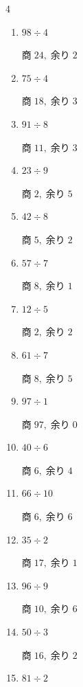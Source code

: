 \begin{multicols}{4}
\begin{enumerate}
        $商\; 8,\; 余り\; 3$

  \item $98 \div 4$

        $商\; 24,\; 余り\; 2$

  \item $75 \div 4$

        $商\; 18,\; 余り\; 3$

  \item $91 \div 8$

        $商\; 11,\; 余り\; 3$

  \item $23 \div 9$

        $商\; 2,\; 余り\; 5$

  \item $42 \div 8$

        $商\; 5,\; 余り\; 2$

  \item $57 \div 7$

        $商\; 8,\; 余り\; 1$

  \item $12 \div 5$

        $商\; 2,\; 余り\; 2$

  \item $61 \div 7$

        $商\; 8,\; 余り\; 5$

  \item $97 \div 1$

        $商\; 97,\; 余り\; 0$

\columnbreak %

  \item $40 \div 6$

        $商\; 6,\; 余り\; 4$

  \item $66 \div 10$

        $商\; 6,\; 余り\; 6$

  \item $35 \div 2$

        $商\; 17,\; 余り\; 1$

  \item $96 \div 9$

        $商\; 10,\; 余り\; 6$

  \item $50 \div 3$

        $商\; 16,\; 余り\; 2$

  \item $81 \div 2$


\end{enumerate}
\end{multicols}
